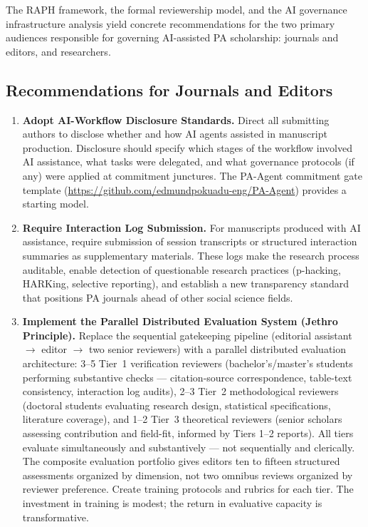\documentclass[12pt]{article}
\begin{document}
The RAPH framework, the formal reviewership model, and the AI governance infrastructure
analysis yield concrete recommendations for the two primary audiences responsible for
governing AI-assisted PA scholarship: journals and editors, and researchers.

\subsection{Recommendations for Journals and Editors}

\begin{enumerate}\setlength{\itemsep}{6pt}

\item \textbf{Adopt AI-Workflow Disclosure Standards.}
Direct all submitting authors to disclose whether and how AI agents assisted in
manuscript production. Disclosure should specify which stages of the workflow involved
AI assistance, what tasks were delegated, and what governance protocols (if any) were
applied at commitment junctures. The PA-Agent commitment gate template
(\url{https://github.com/edmundpokuadu-eng/PA-Agent}) provides a starting model.

\item \textbf{Require Interaction Log Submission.}
For manuscripts produced with AI assistance, require submission of session transcripts
or structured interaction summaries as supplementary materials. These logs make the
research process auditable, enable detection of questionable research practices
(p-hacking, HARKing, selective reporting), and establish a new transparency standard
that positions PA journals ahead of other social science fields.

\item \textbf{Implement the Parallel Distributed Evaluation System (Jethro Principle).}
Replace the sequential gatekeeping pipeline (editorial assistant $\rightarrow$ editor
$\rightarrow$ two senior reviewers) with a parallel distributed evaluation architecture:
3--5 Tier~1 verification reviewers (bachelor's/master's students performing substantive
checks --- citation-source correspondence, table-text consistency, interaction log audits),
2--3 Tier~2 methodological reviewers (doctoral students evaluating research design,
statistical specifications, literature coverage), and 1--2 Tier~3 theoretical reviewers
(senior scholars assessing contribution and field-fit, informed by Tiers 1--2 reports).
All tiers evaluate simultaneously and substantively --- not sequentially and clerically.
The composite evaluation portfolio gives editors ten to fifteen structured assessments
organized by dimension, not two omnibus reviews organized by reviewer preference.
Create training protocols and rubrics for each tier. The investment in training is
modest; the return in evaluative capacity is transformative.


\end{enumerate}
\end{document}
